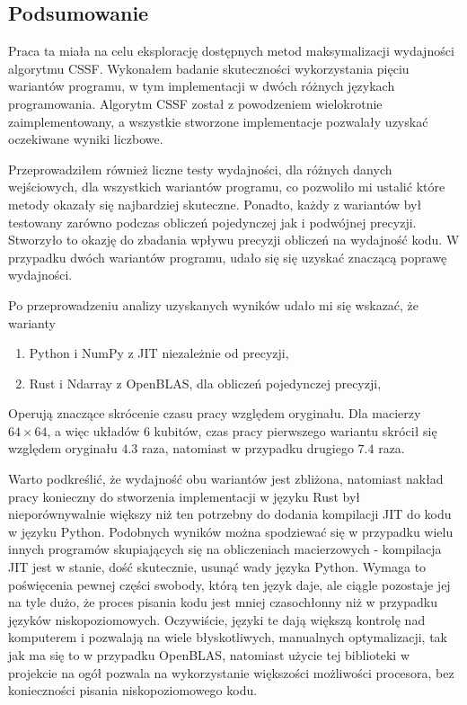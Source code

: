 \documentclass[11pt, a4paper]{article}
\begin{document}
\begin{sloppypar}
    \subsection{Podsumowanie}
    Praca ta miała na celu eksplorację dostępnych metod maksymalizacji wydajności
    algorytmu CSSF. Wykonałem badanie skuteczności wykorzystania pięciu wariantów programu,
    w tym implementacji w dwóch różnych językach programowania. Algorytm CSSF został z powodzeniem
    wielokrotnie zaimplementowany, a wszystkie stworzone implementacje pozwalały uzyskać
    oczekiwane wyniki liczbowe.

    Przeprowadziłem również liczne testy wydajności, dla różnych danych wejściowych, dla
    wszystkich wariantów programu, co pozwoliło mi ustalić które metody okazały się najbardziej
    skuteczne. Ponadto, każdy z wariantów był testowany zarówno podczas obliczeń pojedynczej
    jak i podwójnej precyzji. Stworzyło to okazję do zbadania wpływu precyzji obliczeń
    na wydajność kodu. W przypadku dwóch wariantów programu, udało się się uzyskać
    znaczącą poprawę wydajności.

    Po przeprowadzeniu analizy uzyskanych wyników udało mi się wskazać, że warianty
    \begin{enumerate}
      \item Python i NumPy z JIT niezależnie od precyzji,

      \item Rust i Ndarray z OpenBLAS, dla obliczeń pojedynczej precyzji,
    \end{enumerate}

    Operują znaczące skrócenie czasu pracy względem oryginału. Dla macierzy $64\times64$,
    a więc układów 6 kubitów, czas pracy pierwszego wariantu skrócił się względem oryginału
    $4.3$ raza, natomiast w przypadku drugiego $7.4$ raza.

    Warto podkreślić, że wydajność obu wariantów jest zbliżona, natomiast nakład pracy
    konieczny do stworzenia implementacji w języku Rust był nieporównywalnie większy niż
    ten potrzebny do dodania kompilacji JIT do kodu w języku Python. Podobnych wyników można
    spodziewać się w przypadku wielu innych programów skupiających się na obliczeniach macierzowych
    - kompilacja JIT jest w stanie, dość skutecznie, usunąć wady języka Python. Wymaga
    to poświęcenia pewnej części swobody, którą ten język daje, ale ciągle pozostaje jej
    na tyle dużo, że proces pisania kodu jest mniej czasochłonny niż w przypadku języków
    niskopoziomowych. Oczywiście, języki te dają większą kontrolę nad komputerem i pozwalają
    na wiele błyskotliwych, manualnych optymalizacji, tak jak ma się to w przypadku OpenBLAS,
    natomiast użycie tej biblioteki w projekcie na ogół pozwala na wykorzystanie
    większości możliwości procesora, bez konieczności pisania niskopoziomowego kodu.


\end{sloppypar}
\end{document}
